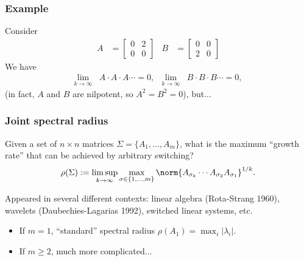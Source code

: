 \documentclass{beamer}
\begin{document}
  \begin{frame}
      \frametitle{Example}
      Consider
      \begin{align*}
          A & =
          \begin{bmatrix}
              0 & 2\\
              0 & 0
          \end{bmatrix}&
          B & =
          \begin{bmatrix}
              0 & 0\\
              2 & 0
          \end{bmatrix}
      \end{align*}
      We have
      \begin{align*}
          \lim_{k \to \infty}& A \cdot A \cdot A \cdots = 0,&
          \lim_{k \to \infty}& B \cdot B \cdot B \cdots = 0,
      \end{align*}
      (in fact, $A$ and $B$ are nilpotent, so $A^2 = B^2 = 0$), but...
  \end{frame}

  \begin{frame}
      \frametitle{Joint spectral radius}
      Given a set of $n \times n$ matrices $\Sigma = \{A_1,\ldots,A_m\}$,
      what is the maximum ``growth rate'' that can be achieved by \alert{arbitrary switching}?
      \[ \rho(\Sigma) := \limsup_{k\to\infty} \max_{\sigma \in \{1,\ldots,m\}} \norm{A_{\sigma_k} \cdots A_{\sigma_2}A_{\sigma_1}}^{1/k}. \]

      Appeared in several different contexts: linear algebra (Rota-Strang 1960), wavelets (Daubechies-Lagarias 1992),
      switched linear systems, etc.

      \begin{itemize}
          \item If $m = 1$, ``standard'' spectral radius $\rho(A_1) = \max_i |\lambda_i|$.
          \item If $m \geq 2$, much more complicated...
      \end{itemize}
  \end{frame}
\end{document}
